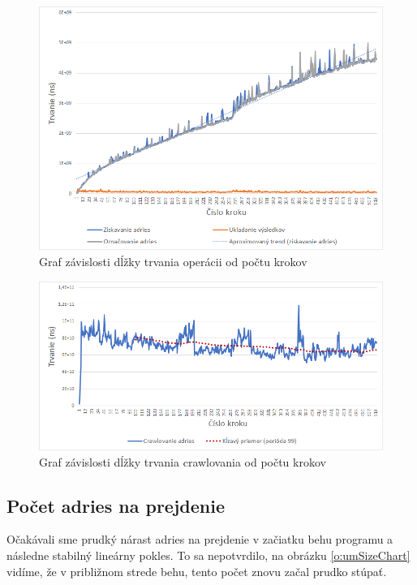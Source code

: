 \begin{figure}[!ht]
    \centering
    \includegraphics[width=1\textwidth]{figures/operationsTime.png}
    \caption{Graf závislosti dĺžky trvania operácii od počtu krokov\label{o:opTimes}}
\end{figure}

\begin{figure}[!ht]
    \centering
    \includegraphics[width=1\textwidth]{figures/crawlTimeChart.png}
    \caption{Graf závislosti dĺžky trvania crawlovania od počtu krokov\label{o:crawlTimeChart}}
\end{figure}



\subsection{Počet adries na prejdenie}
Očakávali sme prudký nárast adries na prejdenie v začiatku behu programu a následne stabilný lineárny pokles. To sa nepotvrdilo, na obrázku \ref{o:umSizeChart} vidíme, že v približnom strede behu, tento počet znovu začal prudko stúpať. 

